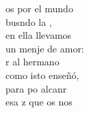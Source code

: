 \begin{cancion}%
	os por el mundo\\
	busndo la ,\\
en ella llevamos\\
	un menje de amor:\\
	r al hermano\\
	como isto enseñó,\\
	para po alcanr\\
	esa z que os nos \\
\end{cancion}%
